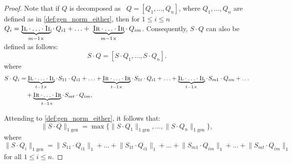 \begin{proof}
  
  Note that if $Q$ is decomposed as  $Q=[Q_1, \ldots, Q_n]$, where $Q_1, \ldots, Q_n$ are defined as in \autoref{def:gen_norm_either}, then for $ 1 \leq i \leq n$  $Q_i = \underbrace{\textsc{Il} \cdot \ldots \cdot \textsc{Il}}_{m-1 \times} \cdot \hspace{2pt} Q_{i1} + \ldots +  \underbrace{\textsc{Ir} \cdot \ldots \cdot \textsc{Ir}}_{m-1 \times} \cdot \hspace{2pt} Q_{im}$.
  Consequently, $S \cdot Q$ can also be defined as follows:
  \begin{equation}
    S \cdot Q = [S \cdot Q_1, \ldots, S \cdot Q_n].
  \end {equation}
  where 
  \begin{equation}
    \begin{split}
    S \cdot Q_i & = \underbrace{\textsc{Il} \cdot \ldots \cdot \textsc{Il}}_{t-1 \times} \cdot \hspace{1pt} S_{11} \cdot Q_{i1} + \ldots +   \underbrace{\textsc{Ir} \cdot \ldots \cdot \textsc{Ir}}_{t-1 \times}\cdot \hspace{1pt} S_{1t} \cdot Q_{i1} + \ldots +  \underbrace{\textsc{Il} \cdot \ldots \cdot \textsc{Il}}_{t-1 \times} \cdot\hspace{1pt} S_{m1} \cdot Q_{im} +  \ldots \\
    & \hspace{10pt}  + \underbrace{\textsc{Ir} \cdot \ldots \cdot \textsc{Ir}}_{t-1 \times}\cdot \hspace{1pt} S_{mt} \cdot Q_{im},
    \end{split}
  \end{equation}
  
  
  Attending to \autoref{def:gen_norm_either}, it follows that:
  \begin{equation} \label{eq:sq_decomposed_norm}
  \lVert S \cdot  Q \rVert_{1 \text{ gen}} = \max \{ \lVert S \cdot Q_1 \rVert_{1 \text{ gen}}, \ldots, \lVert S \cdot Q_n \rVert_{1 \text{ gen}} \},
  \end{equation}
  where 
  \begin{equation} \label{eq:sqi_norm}
  \lVert S \cdot Q_i \rVert_{1 \text{ gen}} =  \lVert S_{11} \cdot Q_{i1} \rVert_{1} + \ldots + \lVert S_{1t} \cdot Q_{i1} \rVert_{1} + \ldots +  \lVert S_{m1} \cdot Q_{im} \rVert_{1} +  \ldots +  \lVert S_{mt} \cdot Q_{im} \rVert_{1}
  \end{equation} 
  for all $1 \leq i \leq n$.
  

\end{proof}
